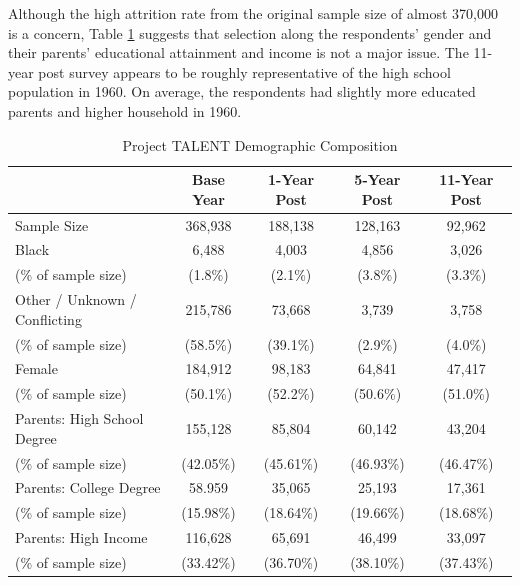 \documentclass[onehalfspacing,11pt]{article}
\begin{document}
	Although the high attrition rate from the original sample size of almost 370,000 is a concern, Table \ref{tab:samplebywave} suggests that selection along the respondents' gender and their parents' educational attainment and income is not a major issue. The 11-year post survey appears to be roughly representative of the high school population in 1960. On average, the respondents had slightly more educated parents and higher household in 1960.
	\begin{table}[h!]
		\centering 
		\begin{tabular}{lcccc}
			\toprule
			& Base Year & 1-Year Post & 5-Year Post & 11-Year Post\\
			\midrule
			Sample Size & 368,938 & 188,138 & 128,163 & 92,962 \\
			\midrule
			Black   & 6,488 & 4,003 & 4,856 & 3,026 \\
			
			\quad (\% of sample size) & (1.8\%) & (2.1\%) & (3.8\%) & (3.3\%) \\
			\midrule
			Other / Unknown / Conflicting & 215,786 & 73,668 & 3,739 & 3,758 \\
			\quad (\% of sample size) & (58.5\%) & (39.1\%) & (2.9\%) & (4.0\%) \\
			\midrule
			Female   & 184,912 & 98,183 & 64,841 & 47,417 \\
			\quad (\% of sample size) & (50.1\%) & (52.2\%) & (50.6\%) & (51.0\%) \\
			\midrule
			Parents: High School Degree & 155,128 & 85,804 & 60,142 & 43,204 \\
			\quad (\% of sample size) & (42.05\%) & (45.61\%) & (46.93\%) & (46.47\%)\\
			\midrule
			Parents: College Degree & 58.959 & 35,065 & 25,193 & 17,361 \\
			\quad (\% of sample size) & (15.98\%) & (18.64\%) & (19.66\%) & (18.68\%)\\
			\midrule
			Parents: High Income & 116,628 & 65,691 & 46,499 & 33,097 \\
			\quad (\% of sample size) & (33.42\%) & (36.70\%) & (38.10\%) & (37.43\%) \\
			\midrule
			\bottomrule
		\end{tabular}
		
		\caption{Project TALENT Demographic Composition}
		\label{tab:samplebywave}
	\end{table}
	
\end{document}
